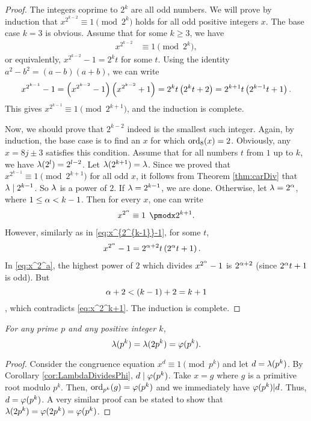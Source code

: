 \documentclass{subfile}
\begin{document}
	\begin{proof}
		The integers coprime to $2^k$ are all odd numbers. We will prove by induction that $x^{2^{k-2}} \equiv1\pmod{2^k}$ holds for all odd positive integers $x$. The base case $k=3$ is obvious. Assume that for some $k\geq 3$, we have
			\begin{align*}
				x^{2^{k-2}} & \equiv1\pmod{2^k},
			\end{align*}
		or equivalently, $x^{2^{k-2}} -1=2^kt$ for some $t$. Using the identity $a^2-b^2=(a-b)(a+b)$, we can write
			\begin{align}
				x^{2^{k-1}} -1 = \left(x^{2^{k-2}} -1\right)\left(x^{2^{k-2}} +1\right) = 2^kt\left(2^kt +2\right) = 2^{k+1}t \left(2^{k-1}t+1\right). \label{eq:x^{2^{k-1}}-1}
			\end{align}
		This gives $x^{2^{k-1}} \equiv 1\pmod{2^{k+1}}$, and the induction is complete.
		
		Now, we should prove that $2^{k-2}$ indeed is the smallest such integer. Again, by induction, the base case is to find an $x$ for which $\operatorname{ord}_8(x)=2$. Obviously, any $x=8j\pm3$ satisfies this condition. Assume that for all numbers $t$ from $1$ up to $k$, we have $\lambda(2^l)=2^{l-2}$. Let $\lambda(2^{k+1})=\lambda$. Since we proved that $x^{2^{k-1}} \equiv 1\pmod{2^{k+1}}$ for all odd $x$, it follows from Theorem \ref{thm:carDiv} that $\lambda \mid 2^{k-1}$. So $\lambda$ is a power of $2$. If $\lambda = 2^{k-1}$, we are done. Otherwise, let $\lambda=2^\alpha$, where $1 \leq \alpha <k-1$. Then for every $x$, one can write
			\begin{align}\label{eq:x^2^k+1}
				x^{2^\a} \equiv 1 \pmod{2^{k+1}}.
			\end{align}
		However, similarly as in \eqref{eq:x^{2^{k-1}}-1}, for some $t$,
			\begin{align}\label{eq:x^2^a}
				x^{2^{\alpha}} -1 &= 2^{\alpha+2}t \left(2^{\alpha}t+1\right).
			\end{align}
		In \eqref{eq:x^2^a}, the highest power of $2$ which divides $x^{2^{\alpha}} -1$ is $2^{\alpha+2}$ (since $2^{\alpha}t+1$ is odd). But $$\alpha+2 <(k-1)+2=k+1$$, which contradicts \eqref{eq:x^2^k+1}. The induction is complete.
	\end{proof}
	
	\begin{theorem}\slshape
		For any prime $p$ and any positive integer $k$, 
		\[\lambda(p^k)=\lambda(2p^k)=\varphi(p^k).\]
	\end{theorem}
	
	\begin{proof}
		Consider the congruence equation $x^d\equiv1\pmod{p^k}$ and let $d=\lambda(p^k)$. By Corollary \ref{cor:LambdaDividesPhi}, $d \mid \varphi(p^k)$. Take $x=g$ where $g$ is a primitive root modulo $p^k$. Then, $\operatorname{ord}_{p^k}(g)=\varphi(p^k)$ and we immediately have $\varphi(p^k)|d$. Thus, $d=\varphi(p^k)$. A very similar proof can be stated to show that $\lambda (2p^k)=\varphi (2p^k) = \varphi (p^k)$.
	\end{proof}
	
\end{document}
